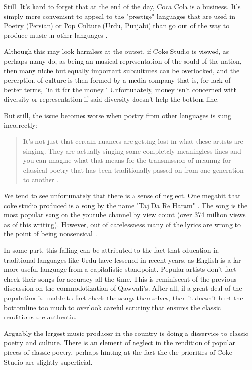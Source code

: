 \documentclass{article}
\begin{document}
Still, It's hard to forget that at the end of the day, Coca Cola is a business. It's
simply more convenient to appeal to the "prestige" languages that are used in
Poetry (Persian) or Pop Culture (Urdu, Punjabi) than go out of the way to produce 
music in other languages \autocite{ethnographicInterview}. 

Although this may look harmless at the outset, if Coke Studio is viewed, as
perhaps many do, as being an musical representation of the sould of the nation,
then many niche but equally important subcultures can be overlooked, and the
perception of culture is then formed by a media company that is, for lack of
better terms, "in it for the money." Unfortunately, money isn't concerned with
diversity or representation if said diversity doesn't help the bottom line.

But still, the issue becomes worse when poetry from other languages is sung
incorrectly: 

\begin{quote}
 It's not just that certain nuances are getting lost in what these artists are
 singing. They are actually singing some completely meaningless lines and you
 can imagine what that means for the transmission of meaning for classical
 poetry that has been traditionally passed on from one generation to another \autocite{herald}.
\end{quote}

We tend to see unfortunately that there is a sense of neglect. One megahit that 
coke studio produced is a song by the name "Taj  Da Re Haram"
\autocite{taajdaar}. The song is the most popular song on the youtube channel by
view count (over 374 million views as of this writing).  However, out of
carelessness many of the lyrics are wrong to the point of being nonsensical
\autocite{herald}.

In some part, this failing can be attributed to the fact that education in
traditional languages like Urdu have lessened in recent years, as English is a
far more useful language from a capitalistic standpoint. Popular artists don't 
fact check their songs for accuracy all the time. This is reminiscent of the 
previous discussion on the commodotization of Qawwali's. After all, if a great 
deal of the population is unable to fact check the songs themselves, then it
doesn't hurt the bottomline too much to overlook careful scrutiny that ensures
the classic renditions are authentic. 

Arguably the largest music producer in the country is doing a disservice to 
classic poetry and culture. There is an element of neglect in the rendition of
popular pieces of classic poetry, perhaps hinting at the fact the the priorities of 
Coke Studio are slightly superficial. 
\end{document}
